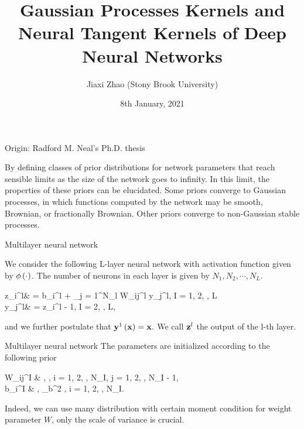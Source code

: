 \documentclass{beamer}
\title[GP and NTK]{Gaussian Processes Kernels and Neural Tangent Kernels of Deep Neural Networks}
\author[J. Zhao (SBU)]{Jiaxi Zhao (Stony Brook University)}
\date{8th January, 2021}
\begin{document}
\par \setlength{\parindent}{2em}

\begin{frame}
\titlepage

\end{frame}


\begin{frame}{Origin: Radford M. Neal's Ph.D. thesis}
\par
By defining classes of prior distributions for network parameters that reach sensible limits as the size of the network goes to infinity. In this limit, the properties of
these priors can be elucidated. Some priors converge to Gaussian processes, in which functions computed by the network may be smooth, Brownian, or fractionally Brownian. Other priors converge to non-Gaussian stable processes.\footnotemark
{}
\end{frame}


\begin{frame}{Multilayer neural network}
\par
We consider the following L-layer neural network with activation function given by $\phi\left( \cdot \right)$. The number of neurons in each layer is given by $N_1, N_2, \cdots, N_L$. 
\bequn
	\begin{aligned}
		z_i^l\lp \mfx \rp & = b_i^l + \sum_{j = 1}^{N_l} W_{ij}^l y_j^{l}\lp \mfx \rp, \qquad I = 1, 2, \cdots, L\\
		y_j^l\lp \mfx \rp & = \phi\lp z_i^{l - 1}\lp \mfx \rp \rp, \qquad I = 2, \cdots, L,
	\end{aligned}
\eequn
and we further postulate that $\mathbf{y}^1\left( \mathbf{x} \right) = \mathbf{x}.$ We call $\mathbf{z}^l$ the output of the l-th layer.

\end{frame}


\begin{frame}{Multilayer neural network}
The parameters are initialized according to the following prior
\bequn
	\begin{aligned}
		W_{ij}^I &  \mcN{},  \rp, \quad i = 1, 2, \cdots, N_I, j = 1, 2, \cdots, N_{I - 1},	\\
		b_i^I &  \mcN{}, \sigma_b^2 \rp, \quad i = 1, 2, \cdots, N_I. 
	\end{aligned}
\eequn
Indeed, we can use many distribution with certain moment condition for weight parameter $W$, only the scale of variance is crucial.
\end{frame}
\end{document}
